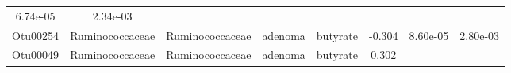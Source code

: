 \documentclass[11pt,]{article}
\begin{document}
\begin{longtable}[]{@{}cccccccc@{}}
\begin{minipage}[t]{0.08\columnwidth}
6.74e-05\strut
\end{minipage} & \begin{minipage}[t]{0.08\columnwidth}\centering\strut
2.34e-03\strut
\end{minipage}\tabularnewline
\begin{minipage}[t]{0.08\columnwidth}\centering\strut
Otu00254\strut
\end{minipage} & \begin{minipage}[t]{0.15\columnwidth}\centering\strut
Ruminococcaceae\strut
\end{minipage} & \begin{minipage}[t]{0.15\columnwidth}\centering\strut
Ruminococcaceae\strut
\end{minipage} & \begin{minipage}[t]{0.08\columnwidth}\centering\strut
adenoma\strut
\end{minipage} & \begin{minipage}[t]{0.09\columnwidth}\centering\strut
butyrate\strut
\end{minipage} & \begin{minipage}[t]{0.07\columnwidth}\centering\strut
-0.304\strut
\end{minipage} & \begin{minipage}[t]{0.08\columnwidth}\centering\strut
8.60e-05\strut
\end{minipage} & \begin{minipage}[t]{0.08\columnwidth}\centering\strut
2.80e-03\strut
\end{minipage}\tabularnewline
\begin{minipage}[t]{0.08\columnwidth}\centering\strut
Otu00049\strut
\end{minipage} & \begin{minipage}[t]{0.15\columnwidth}\centering\strut
Ruminococcaceae\strut
\end{minipage} & \begin{minipage}[t]{0.15\columnwidth}\centering\strut
Ruminococcaceae\strut
\end{minipage} & \begin{minipage}[t]{0.08\columnwidth}\centering\strut
adenoma\strut
\end{minipage} & \begin{minipage}[t]{0.09\columnwidth}\centering\strut
butyrate\strut
\end{minipage} & \begin{minipage}[t]{0.07\columnwidth}\centering\strut
0.302\strut
\end{minipage} & \begin{minipage}[t]{0.08\columnwidth}\centering\strut

\end{minipage}
\end{longtable}
\end{document}
